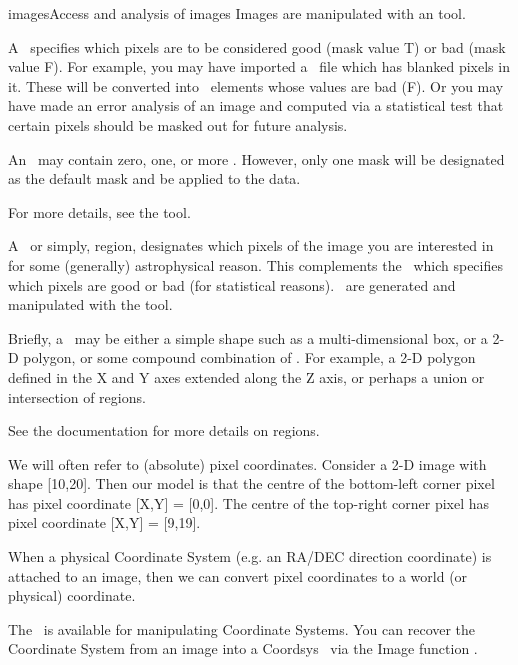 \begin{ahmodule}{images}{Access and analysis of images}
Images are manipulated with an  tool. 



\medskip
{}

A \pixelmask\ specifies which pixels are to be considered good (mask
value {\cf T}) or bad (mask value {\cf F}).  For example, you may have
imported a \fits\ file which has blanked pixels in it.  These will be
converted into \pixelmask\ elements whose values are bad ({\cf F}).  Or
you may have made an error analysis of an image and computed via a
statistical test that certain pixels should be masked out for future
analysis.  

An \imagefile\ may contain zero, one, or more \pixelmasks.  However,
only one mask will be designated as the default mask and be applied
to the data.

For more details, see the  tool. 



\medskip
{}

A \region\, or simply, region, designates which pixels of the image you
are interested in for some (generally) astrophysical reason.  This
complements the \pixelmask\ which specifies which pixels are good or bad
(for statistical reasons).  \Regions\ are generated and manipulated with
the  tool.   

Briefly, a \region\  may be either a simple shape such as a multi-dimensional box, or a
2-D polygon, or some compound combination of \regions. For example,
a 2-D polygon defined in the X and Y axes extended along the Z axis,
or perhaps a union or intersection of regions.

See the  documentation for
more details on regions. 


\medskip
{}

We will often refer to (absolute) pixel coordinates.  Consider a 2-D
image with shape [10,20].  Then our model is that the centre of the 
bottom-left corner pixel has pixel coordinate [X,Y] = [0,0].  The centre
of the top-right corner pixel has pixel coordinate [X,Y] = [9,19]. 

When a physical Coordinate System (e.g. an RA/DEC direction coordinate)
is attached to an image, then we can convert pixel coordinates to a
world (or physical) coordinate.

The  \tool\ is available for
manipulating Coordinate Systems. You can recover the Coordinate System
from an image into a Coordsys \tool\ via the Image function
.


\end{ahmodule}
